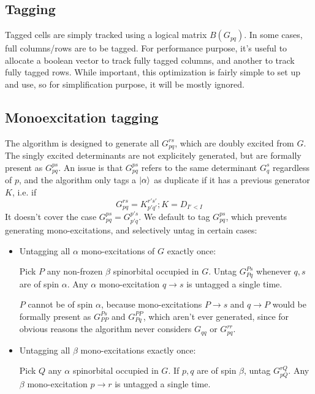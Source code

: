 \subsection{Tagging}

Tagged cells are simply tracked using a logical matrix $B(G_{pq})$.
In some cases, full columns/rows are to be tagged. For performance purpose, it's useful to allocate a boolean vector to track fully tagged columns, and another to track fully tagged rows. While important, this optimization is fairly simple to set up and use, so for simplification purpose, it will be mostly ignored.


\subsection{Monoexcitation tagging}

The algorithm is designed to generate all $G_{pq}^{rs}$, which are doubly excited from $G$. The singly excited determinants are not explicitely generated, but are formally present as $G_{pq}^{ps}$.
An issue is that $G_{pq}^{ps}$ refers to the same determinant $G_q^s$ regardless of $p$, and the algorithm only tags a $| \alpha \rangle$ as duplicate if it has a previous generator $K$, i.e. if
$$G_{pq}^{rs} = {K}_{p'q'}^{r's'} ; K = D_{I'<I}$$
It doesn't cover the case $G_{pq}^{ps} = G_{p'q}^{p's}$.
We default to tag $G_{pq}^{ps}$, which prevents generating mono-excitations, and selectively untag in certain cases:


\begin{itemize}
\item
Untagging all $\alpha$ mono-excitations of $G$ exactly once:

Pick $P$ any non-frozen $\beta$ spinorbital occupied in $G$. Untag $G_{Pq}^{Ps}$ whenever $q,s$ are of spin $\alpha$. Any $\alpha$ mono-excitation $q \rightarrow  s$ is untagged a single time.

$P$ cannot be of spin $\alpha$, because mono-excitations $P \rightarrow  s$ and $q \rightarrow  P$ would be formally present as $G_{PP}^{Ps}$ and $G_{Pq}^{PP}$, which aren't ever generated, since for obvious reasons the algorithm never considers $G_{qq}$ or $G_{pq}^{rr}$.
\item
Untagging all $\beta$ mono-excitations exactly once:

Pick $Q$ any $\alpha$ spinorbital occupied in $G$. If $p,q$ are of spin $\beta$, untag $G_{pQ}^{rQ}$. Any $\beta$ mono-excitation $p \rightarrow  r$ is untagged a single time.
\end{itemize}


